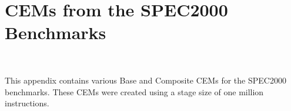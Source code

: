 \chapter{CEMs from the SPEC2000 Benchmarks}~\label{app:exe_maps}

This appendix contains various Base and Composite CEMs for the SPEC2000
benchmarks. These CEMs were created using a stage size of one million
instructions.





